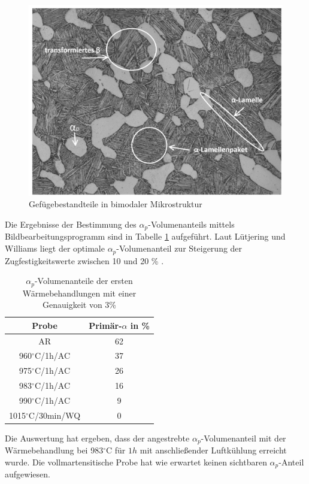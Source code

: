 \begin{figure}[h]
	\centering
	\includegraphics[width=0.9\linewidth]{./Bilder/Abbildung 20}
	\caption[Abbildung 20]{Gefügebestandteile in bimodaler Mikrostruktur}
	\label{fig:abbildung-20}
\end{figure}

Die Ergebnisse der Bestimmung des $\alpha_p$-Volumenanteils mittels Bildbearbeitungsprogramm sind in Tabelle \ref{Tabelle 4} aufgeführt. Laut Lütjering und Williams liegt der optimale $\alpha_p$-Volumenanteil zur Steigerung der Zugfestigkeitswerte zwischen 10 und 20 \% \cite{Lutjering.2007}.

\begin{table}[h]
	\centering
	\begin{tabular}{|c|c|}
		\hline 
		Probe & Primär-$\alpha$ in \% \\ 
		\hline 
		AR & 62 \\ 
		\hline 
		960$^\circ$C/1h/AC & 37 \\ 
		\hline 
		975$^\circ$C/1h/AC & 26 \\ 
		\hline 
		983$^\circ$C/1h/AC & 16 \\ 
		\hline 
		990$^\circ$C/1h/AC & 9 \\ 
		\hline 
		1015$^\circ$C/30min/WQ & 0 \\ 
		\hline 
	\end{tabular} 
	\caption{$\alpha_p$-Volumenanteile der ersten Wärmebehandlungen mit einer Genauigkeit von 3\%}
	\label{Tabelle 4}
\end{table}

Die Auswertung hat ergeben, dass der angestrebte $\alpha_p$-Volumenanteil mit der Wärmebehandlung bei 983$^\circ$C für $1 h$ mit anschließender Luftkühlung erreicht wurde. Die vollmartensitische Probe hat wie erwartet keinen sichtbaren $\alpha_p$-Anteil aufgewiesen.


